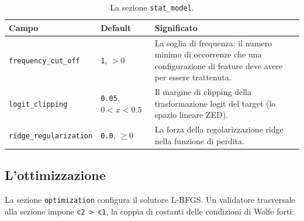 \begin{table}[htbp]
\centering
\small
\begin{tabularx}{\textwidth}{@{}llX@{}}
\toprule
Campo & Default & Significato \\
\midrule
\texttt{frequency\_cut\_off} & \texttt{1}, $>0$ & La soglia di frequenza: il numero minimo di occorrenze che una configurazione di feature deve avere per essere trattenuta. \\
\texttt{logit\_clipping} & \texttt{0.05}, $0<x<0.5$ & Il margine di clipping della trasformazione logit del target (lo spazio lineare ZED). \\
\texttt{ridge\_regularization} & \texttt{0.0}, $\ge 0$ & La forza della regolarizzazione ridge nella funzione di perdita. \\
\bottomrule
\end{tabularx}
\caption{La sezione \texttt{stat\_model}.}
\label{tab:setup-statmodel}
\end{table}

\subsection{L'ottimizzazione}

La sezione \texttt{optimization} configura il solutore L-BFGS. Un
validatore trasversale alla sezione impone \texttt{c2 > c1}, la coppia di
costanti delle condizioni di Wolfe forti:

